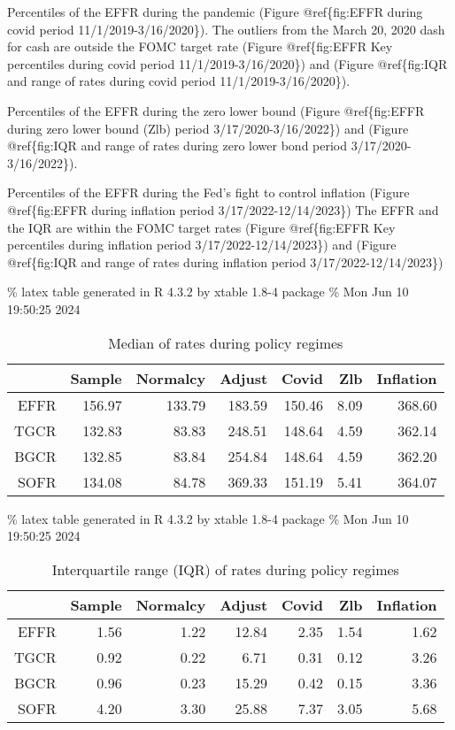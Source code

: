 \documentclass[
]{article}
\begin{document}
Percentiles of the EFFR during the pandemic (Figure @ref\{fig:EFFR during covid period 11/1/2019-3/16/2020\}). The outliers from the March 20, 2020 dash for cash are outside the FOMC target rate (Figure @ref\{fig:EFFR Key percentiles during covid period 11/1/2019-3/16/2020\}) and (Figure @ref\{fig:IQR and range of rates during covid period 11/1/2019-3/16/2020\}).

Percentiles of the EFFR during the zero lower bound (Figure @ref\{fig:EFFR during zero lower bound (Zlb) period 3/17/2020-3/16/2022\}) and (Figure @ref\{fig:IQR and range of rates during zero lower bond period 3/17/2020-3/16/2022\}).

Percentiles of the EFFR during the Fed's fight to control inflation (Figure @ref\{fig:EFFR during inflation period 3/17/2022-12/14/2023\}) The EFFR and the IQR are within the FOMC target rates (Figure @ref\{fig:EFFR Key percentiles during inflation period 3/17/2022-12/14/2023\}) and (Figure @ref\{fig:IQR and range of rates during inflation period 3/17/2022-12/14/2023\})

\% latex table generated in R 4.3.2 by xtable 1.8-4 package
\% Mon Jun 10 19:50:25 2024

\begin{table}[ht]
\centering
\begin{tabular}{rrrrrrr}
  \hline
 & Sample & Normalcy & Adjust & Covid & Zlb & Inflation \\ 
  \hline
EFFR & 156.97 & 133.79 & 183.59 & 150.46 & 8.09 & 368.60 \\ 
  TGCR & 132.83 & 83.83 & 248.51 & 148.64 & 4.59 & 362.14 \\ 
  BGCR & 132.85 & 83.84 & 254.84 & 148.64 & 4.59 & 362.20 \\ 
  SOFR & 134.08 & 84.78 & 369.33 & 151.19 & 5.41 & 364.07 \\ 
   \hline
\end{tabular}
\caption{Median of rates during policy regimes} 
\end{table}

\% latex table generated in R 4.3.2 by xtable 1.8-4 package
\% Mon Jun 10 19:50:25 2024

\begin{table}[ht]
\centering
\begin{tabular}{rrrrrrr}
  \hline
 & Sample & Normalcy & Adjust & Covid & Zlb & Inflation \\ 
  \hline
EFFR & 1.56 & 1.22 & 12.84 & 2.35 & 1.54 & 1.62 \\ 
  TGCR & 0.92 & 0.22 & 6.71 & 0.31 & 0.12 & 3.26 \\ 
  BGCR & 0.96 & 0.23 & 15.29 & 0.42 & 0.15 & 3.36 \\ 
  SOFR & 4.20 & 3.30 & 25.88 & 7.37 & 3.05 & 5.68 \\ 
   \hline
\end{tabular}
\caption{Interquartile range (IQR) of rates during policy regimes} 
\end{table}
\end{document}
